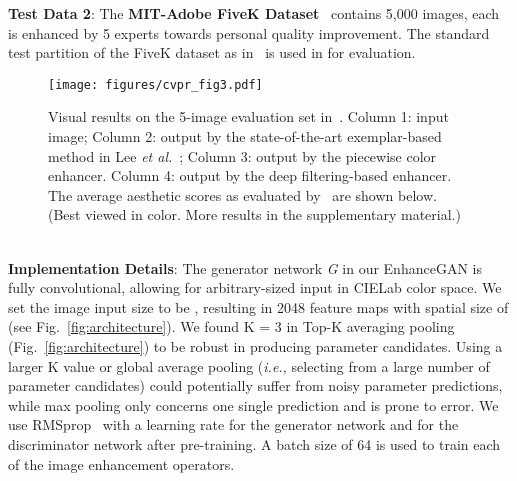 \documentclass[sigconf]{acmart}
\newcommand{\etal}{\textit{et al.}}
\begin{document}
\noindent\textbf{Test Data 2}:
The \textbf{MIT-Adobe FiveK Dataset}~\cite{bychkovsky2011learning} contains 5,000 images, each is enhanced by 5 experts towards personal quality improvement. The standard test partition of the FiveK dataset as in~\cite{bychkovsky2011learning} is used in for evaluation.
\begin{figure}[t]
\begin{center}
\texttt{[image: figures/cvpr\_fig3.pdf]}
\end{center}
\vskip -0.3cm
\caption{Visual results on the 5-image evaluation set in~\cite{lee2016automatic}. Column 1: input image; Column 2: output by the state-of-the-art exemplar-based method in Lee \etal~\cite{lee2016automatic}; Column 3: output by the piecewise color enhancer. Column 4: output by the deep filtering-based enhancer. The average aesthetic scores as evaluated by~\cite{deng2017image} are shown below. (Best viewed in color. More results in the supplementary material.)}
\label{fig:linzhe}
\end{figure}
\\
\noindent\textbf{Implementation Details}:
\noindent The generator network \textit{G} in our EnhanceGAN is fully convolutional, allowing for arbitrary-sized input in CIELab color space. We set the image input size to be , resulting in 2048 feature maps with spatial size of  (see Fig.~\ref{fig:architecture}). We found K = 3 in Top-K averaging pooling (Fig.~\ref{fig:architecture}) to be robust in producing parameter candidates. Using a larger K value or global average pooling (\textit{i.e.,} selecting from a large number of parameter candidates) could potentially suffer from noisy parameter predictions, while max pooling only concerns one single prediction and is prone to error. We use RMSprop~\cite{tieleman2012lecture} with a learning rate  for the generator network and  for the discriminator network after pre-training. A batch size of 64 is used to train each of the image enhancement operators.
\end{document}
